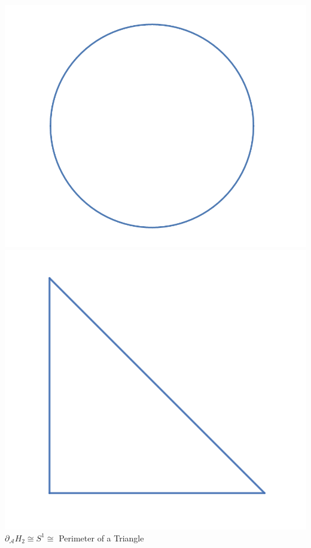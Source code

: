 \documentclass[12pt]{article}
\newcommand{\cA}{{\mathcal A}}
\theoremstyle{definition}
\begin{document}
\begin{enumerate}
\begin{center}
                  \includegraphics[scale = 0.4]{D H_0.png}\includegraphics[scale=0.4]{perimeter.png}\\
                  $\partial_\cA H_2 \cong S^1 \cong$ Perimeter of a Triangle
            
            \end{center}
\end{enumerate}
\end{document}
